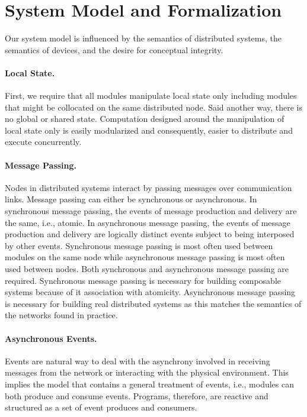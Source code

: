 \documentclass[letterpaper]{article}
\begin{document}



\pagebreak

\section{System Model and Formalization\label{system_model}}

Our system model is influenced by the semantics of distributed systems, the semantics of devices, and the desire for conceptual integrity.

\paragraph{Local State.}
First, we require that all modules manipulate local state only including modules that might be collocated on the same distributed node. 
Said another way, there is no global or shared state.
Computation designed around the manipulation of local state only is easily modularized and consequently, easier to distribute and execute concurrently.

\paragraph{Message Passing.}
Nodes in distributed systems interact by passing messages over communication links.
Message passing can either be synchronous or asynchronous.
In synchronous message passing, the events of message production and delivery are the same, i.e., atomic.
In asynchronous message passing, the events of message production and delivery are logically distinct events subject to being interposed by other events.
Synchronous message passing is most often used between modules on the same node while asynchronous message passing is most often used between nodes.
Both synchronous and asynchronous message passing are required.
Synchronous message passing is necessary for building composable systems because of it association with atomicity.
Asynchronous message passing is necessary for building real distributed systems as this matches the semantics of the networks found in practice.

\paragraph{Asynchronous Events.}
Events are natural way to deal with the asynchrony involved in receiving messages from the network or interacting with the physical environment.
This implies the model that contains a general treatment of events, i.e., modules can both produce and consume events.
Programs, therefore, are reactive and structured as a set of event produces and consumers.
\end{document}
